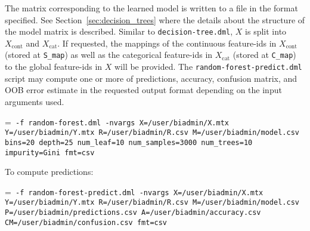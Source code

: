 \smallskip
{}
\smallskip


The matrix corresponding to the learned model is written to a file in the format specified. See Section~\ref{sec:decision_trees} where the details about the structure of the model matrix is described.
Similar to {\tt decision-tree.dml}, $X$ is split into $X_\text{cont}$ and $X_\text{cat}$. 
If requested, the mappings of the continuous feature-ids in $X_\text{cont}$ (stored at {\tt S\_map}) as well as the categorical feature-ids in $X_\text{cat}$ (stored at {\tt C\_map}) to the global feature-ids in $X$ will be provided. 
The {\tt random-forest-predict.dml} script may compute one or more of
predictions, accuracy, confusion matrix, and OOB error estimate in the requested output format depending on the input arguments used. 
 


\smallskip
{}
\smallskip

{\hangindent=\parindent\noindent\tt
	\hml -f random-forest.dml -nvargs X=/user/biadmin/X.mtx Y=/user/biadmin/Y.mtx
	R=/user/biadmin/R.csv M=/user/biadmin/model.csv
	bins=20 depth=25 num\_leaf=10 num\_samples=3000 num\_trees=10 impurity=Gini fmt=csv
	
}\smallskip


\noindent To compute predictions:

{\hangindent=\parindent\noindent\tt
	\hml -f random-forest-predict.dml -nvargs X=/user/biadmin/X.mtx Y=/user/biadmin/Y.mtx R=/user/biadmin/R.csv
	M=/user/biadmin/model.csv P=/user/biadmin/predictions.csv
	A=/user/biadmin/accuracy.csv CM=/user/biadmin/confusion.csv fmt=csv
	
}\smallskip


%
